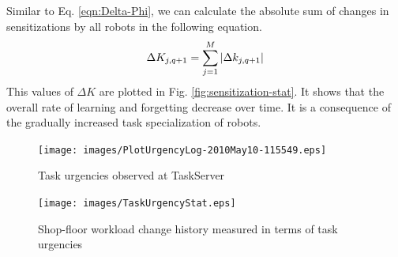 \documentclass{llncs}
\begin{document}
%
Similar to Eq. \ref{eqn:Delta-Phi}, we can calculate the absolute sum of changes in sensitizations by all robots in the following equation.
% 
\begin{equation}
\small 
\Delta K_{j, q+1} = \sum_{j=1}^{M} \left | \Delta k_{j, q+1} \right |
\label{eqn:Delta-K}
\end{equation}
This values of $\Delta K$ are plotted in Fig. \ref{fig:sensitization-stat}. It shows that the overall rate of learning and forgetting decrease over time. It is a consequence of the gradually increased task specialization of robots.
\begin{figure}
\begin{minipage}[t]{0.48\linewidth}
\centering
\texttt{[image: images/PlotUrgencyLog-2010May10-115549.eps]}
\caption{\small Task urgencies observed at TaskServer}
\label{fig:raw-urgencies} %
\end{minipage}
\hspace{0.5cm}
\begin{minipage}[t]{0.48\linewidth}
\centering
\texttt{[image: images/TaskUrgencyStat.eps]}
\caption{\small Shop-floor workload change history measured in terms of task urgencies}
\label{fig:urgency-convergence} %
\end{minipage}
\end{figure}
\end{document}
